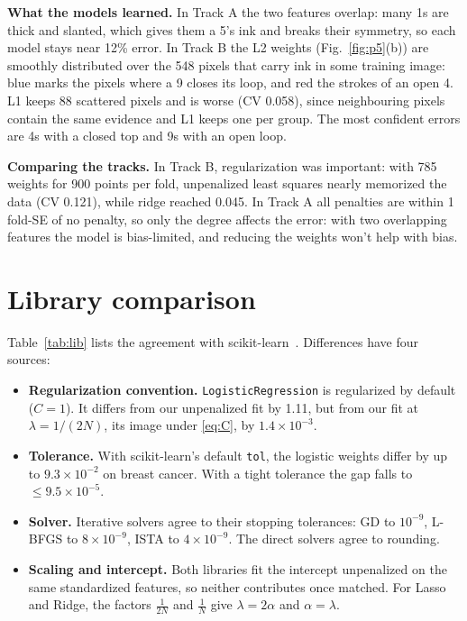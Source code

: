 \documentclass[conference]{IEEEtran}
\begin{document}
\textbf{What the models learned.} In Track A the two features overlap: many 1s are thick and slanted, which gives them a 5's ink and breaks their symmetry, so each model stays near 12\% error. In Track B the L2 weights (Fig.~\ref{fig:p5}(b)) are smoothly distributed over the 548 pixels that carry ink in some training image: blue marks the pixels where a 9 closes its loop, and red the strokes of an open 4. L1 keeps 88 scattered pixels and is worse (CV 0.058), since neighbouring pixels contain the same evidence and L1 keeps one per group. The most confident errors are 4s with a closed top and 9s with an open loop.

\textbf{Comparing the tracks.} In Track B, regularization was important: with 785 weights for 900 points per fold, unpenalized least squares nearly memorized the data (CV 0.121), while ridge reached 0.045. In Track A all penalties are within 1 fold-SE of no penalty, so only the degree affects the error: with two overlapping features the model is bias-limited, and reducing the weights won't help with bias.


\section{Library comparison}\label{sec:lib}
Table~\ref{tab:lib} lists the agreement with scikit-learn~\cite{sklearn}. Differences have four sources:
\begin{itemize}
\item \textbf{Regularization convention.} \texttt{LogisticRegression} is regularized by default ($C=1$). It differs from our unpenalized fit by 1.11, but from our fit at $\lambda=1/(2N)$, its image under \eqref{eq:C}, by $1.4\times10^{-3}$.
\item \textbf{Tolerance.} With scikit-learn's default \texttt{tol}, the logistic weights differ by up to $9.3\times10^{-2}$ on breast cancer. With a tight tolerance the gap falls to $\le9.5\times10^{-5}$.
\item \textbf{Solver.} Iterative solvers agree to their stopping tolerances: GD to $10^{-9}$, L-BFGS to $8\times10^{-9}$, ISTA to $4\times10^{-9}$. The direct solvers agree to rounding.
\item \textbf{Scaling and intercept.} Both libraries fit the intercept unpenalized on the same standardized features, so neither contributes once matched. For Lasso and Ridge, the factors $\frac1{2N}$ and $\frac1N$ give $\lambda=2\alpha$ and $\alpha=\lambda$.
\end{itemize}
\end{document}
